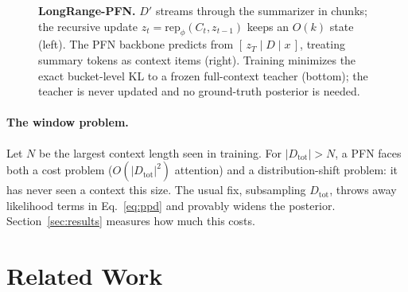 \documentclass{article}
\newcommand{\Dtot}{D_{\mathrm{tot}}}
\newcommand{\Dfar}{D'}
\newcommand{\Dloc}{D}
\newcommand{\rep}{\mathrm{rep}}
\begin{document}
\begin{figure}[t]
\caption{\textbf{LongRange-PFN.} $\Dfar$ streams through the summarizer in
chunks; the recursive update $z_t = \rep_\phi(C_t, z_{t-1})$ keeps an
$O(k)$ state (left). The PFN backbone predicts from
$[\,z_T \mid \Dloc \mid x\,]$, treating summary tokens as context items
(right). Training minimizes the exact bucket-level KL to a frozen
full-context teacher (bottom); the teacher is never updated and no
ground-truth posterior is needed.}
\label{fig:schematic}
\end{figure}

\paragraph{The window problem.} Let $N$ be the largest context length seen
in training. For $|\Dtot| > N$, a PFN faces both a cost problem
($O(|\Dtot|^2)$ attention) and a distribution-shift problem: it has never
seen a context this size. The usual fix, subsampling $\Dtot$, throws away
likelihood terms in Eq.~\eqref{eq:ppd} and provably widens the posterior.
Section~\ref{sec:results} measures how much this costs.

\section{Related Work}
\label{sec:related}
\end{document}
